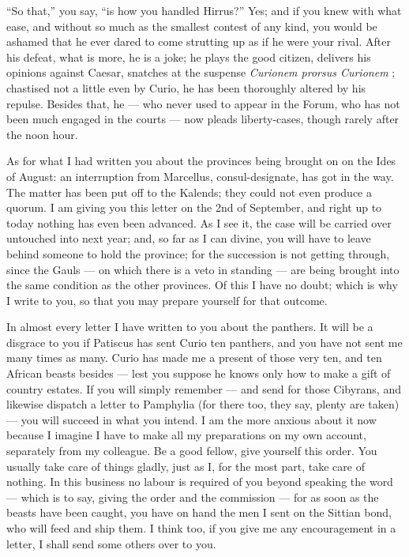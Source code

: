 

 ``So that,'' you say, ``is how you handled Hirrus?'' Yes; and if you knew with what ease, and without so much as the smallest contest of any kind, you would be ashamed that he ever dared to come strutting up as if he were your rival. After his defeat, what is more, he is a joke; he plays the good citizen, delivers his opinions against Caesar, snatches at the suspense \textdagger \textit{Curionem prorsus Curionem} \textdagger; chastised not a little even by Curio, he has been thoroughly altered by his repulse. Besides that, he --- who never used to appear in the Forum, who has not been much engaged in the courts --- now pleads liberty-cases, though rarely after the noon hour.

 As for what I had written you about the provinces being brought on on the Ides of August: an interruption from Marcellus, consul-designate, has got in the way. The matter has been put off to the Kalends; they could not even produce a quorum. I am giving you this letter on the 2nd of September, and right up to today nothing has even been advanced. As I see it, the case will be carried over untouched into next year; and, so far as I can divine, you will have to leave behind someone to hold the province; for the succession is not getting through, since the Gauls --- on which there is a veto in standing --- are being brought into the same condition as the other provinces. Of this I have no doubt; which is why I write to you, so that you may prepare yourself for that outcome.

 In almost every letter I have written to you about the panthers. It will be a disgrace to you if Patiscus has sent Curio ten panthers, and you have not sent me many times as many. Curio has made me a present of those very ten, and ten African beasts besides --- lest you suppose he knows only how to make a gift of country estates. If you will simply remember --- and send for those Cibyrans, and likewise dispatch a letter to Pamphylia (for there too, they say, plenty are taken) --- you will succeed in what you intend. I am the more anxious about it now because I imagine I have to make all my preparations on my own account, separately from my colleague. Be a good fellow, give yourself this order. You usually take care of things gladly, just as I, for the most part, take care of nothing. In this business no labour is required of you beyond speaking the word --- which is to say, giving the order and the commission --- for as soon as the beasts have been caught, you have on hand the men I sent on the Sittian bond, who will feed and ship them. I think too, if you give me any encouragement in a letter, I shall send some others over to you.

